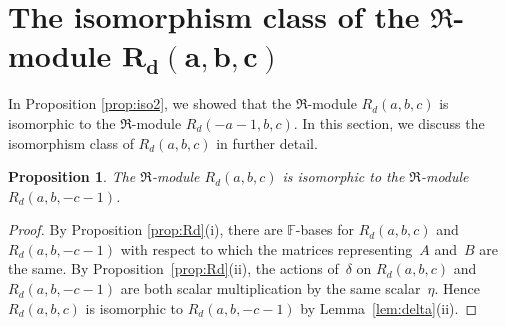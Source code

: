 \documentclass[pdftex]{sigma}
\def\F{\mathbb F}
\numberwithin{equation}{section}
\newtheorem{Proposition}[Theorem]{Proposition}
 { \theoremstyle{definition}
\newtheorem{Definition}[Theorem]{Definition}
\newtheorem{Example}[Theorem]{Example} }
\begin{document}
\section[The isomorphism class of the $\Re$-module $R_d(a,b,c)$]{The isomorphism class of the $\boldsymbol{\Re}$-module $\boldsymbol{R_d(a,b,c)}$}\label{s:iso}

In Proposition \ref{prop:iso2}, we showed that the $\Re$-module $R_d(a,b,c)$ is isomorphic to the $\Re$-module $R_d(-a-1,b,c)$. In this section, we discuss the isomorphism class of $R_d(a,b,c)$ in further detail.

\begin{Proposition}\label{prop:iso1}The $\Re$-module $R_d(a,b,c)$ is isomorphic to the $\Re$-module $R_d(a,b,-c-1)$.
\end{Proposition}
\begin{proof}By Proposition \ref{prop:Rd}(i), there are $\F$-bases for $R_d(a,b,c)$ and $R_d(a,b,-c-1)$ with respect to which the matrices representing~$A$ and~$B$ are the same. By Proposition~\ref{prop:Rd}(ii), the actions of~$\delta$ on $R_d(a,b,c)$ and $R_d(a,b,-c-1)$ are both scalar multiplication by the same scalar~$\eta$. Hence $R_d(a,b,c)$ is isomorphic to $R_d(a,b,-c-1)$ by Lemma~\ref{lem:delta}(ii).
\end{proof}
\end{document}
